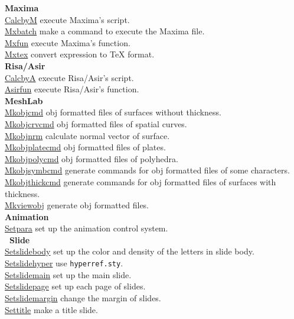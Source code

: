 \documentclass[papersize,a4paper,12pt]{article}
\begin{document}
\begin{tabbing}
{\bf Maxima} \> \\
\hyperlink{calcbym}{CalcbyM} \> execute Maxima's script. \\
\hyperlink{mxbatch}{Mxbatch} \> make a command to execute the Maxima file. \\
\hyperlink{mxfun}{Mxfun} \> execute Maxima's function. \\
\hyperlink{mxtex}{Mxtex} \> convert expression to TeX format. \\

{\bf Risa/Asir} \> \\
\hyperlink{calcbya}{CalcbyA} \> execute Risa/Asir's script. \\
\hyperlink{asirfun}{Asirfun} \> execute Risa/Asir's function. \\

{\bf MeshLab} \> \\
\hyperlink{mkobjcmd}{Mkobjcmd} \> obj formatted files of surfaces without thickness.\\
\hyperlink{mkobjcrvcmd}{Mkobjcrvcmd} \> obj formatted files of spatial curves.\\
\hyperlink{mkobjnrm}{Mkobjnrm} \> calculate normal vector of surface.\\
\hyperlink{mkobjplatecmd}{Mkobjplatecmd} \> obj formatted files of plates.\\
\hyperlink{mkobjpolycmd}{Mkobjpolycmd} \> obj formatted files of polyhedra.\\
\hyperlink{mkobjsymbcmd}{Mkobjsymbcmd} \> generate commands for obj formatted files of some characters.\\
\hyperlink{mkobjthickcmd}{Mkobjthickcmd} \> generate commands for obj formatted files of surfaces with thickness.\\
\hyperlink{mkviewobj}{Mkviewobj} \> generate obj formatted files.\\
{\bf Animation} \> \\
\hyperlink{setpara}{Setpara} \> set up the animation control system.\\

{\bf \ketcindy\ Slide} \> \\
\hyperlink{setslidebody}{Setslidebody} \> set up the color and density of the letters in slide body.\\
\hyperlink{setslidehyper}{Setslidehyper} \> use \verb|hyperref.sty|.\\
\hyperlink{setslidemain}{Setslidemain} \> set up the main slide.\\
\hyperlink{setslidepage}{Setslidepage} \> set up each page of slides.\\
\hyperlink{setslidemargin}{Setslidemargin} \> change the margin of slides.\\
\hyperlink{settitle}{Settitle} \> make a title slide.\\


\end{tabbing}
\end{document}
